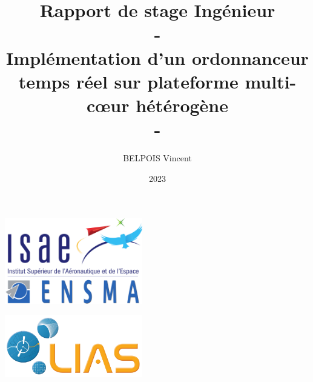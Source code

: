 \documentclass{article}
\title{Rapport de stage Ingénieur \\-\\Implémentation d'un ordonnanceur temps réel sur
plateforme multi-cœur hétérogène\\-}
\author{BELPOIS Vincent}
\begin{document}
    \date{2023}
    \maketitle
    \thispagestyle{empty}
    
    \vspace{10mm}
    
    \begin{center}
        \includegraphics[width = 6cm]{Images/logo_ensma.png}
    \end{center}
    \vspace{2cm}
    \begin{center}
        \includegraphics[width = 6cm]{Images/logo_LIAS.png}
    \end{center}
    \newpage
    \tableofcontents

    
    \newpage
    
\end{document}
